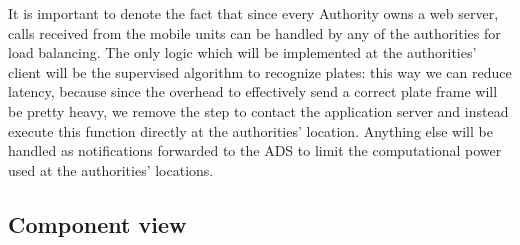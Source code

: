 \documentclass[12pt,a4paper]{article}
\begin{document}
It is important to denote the fact that since every Authority owns a web server, calls received from the mobile units can be handled by any of the authorities for load balancing. The only logic which will be implemented at the authorities' client will be the supervised algorithm to recognize plates: this way
we can reduce latency, because since the overhead to effectively send a correct plate frame will be pretty heavy, we remove the step to contact the application server and instead execute this function directly at the authorities' location. Anything else will be handled as notifications forwarded to the ADS
to limit the computational power used at the authorities' locations.

\newpage
\subsection{Component view}
\end{document}
